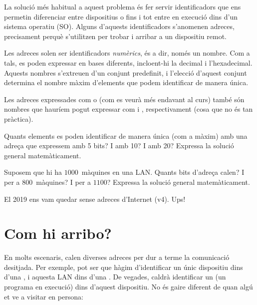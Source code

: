 La solució més habitual a aquest problema és fer servir identificadors que ens permetin
diferenciar entre dispositius o fins i tot entre  en execució
dins d'un sistema operatiu (SO). Alguns d'aquests identificadors
s'anomenen adreces, precisament perquè s'utilitzen 
per trobar i arribar a un dispositiu remot. 


Les adreces solen ser identificadors \textit{numèrics}, és a dir, només un nombre.
Com a tals, es poden expressar en bases diferents, incloent-hi la decimal i l'hexadecimal.
Aquests nombres s'extreuen d'un conjunt predefinit, i l'elecció d'aquest conjunt
determina el nombre màxim d'elements que podem identificar de manera única.

\begin{remark}
Les adreces expressades com  o  
(com es veurà més endavant al curs) també són nombres que hauríem pogut expressar 
com  i , respectivament
(cosa que no és tan pràctica).
\end{remark}

\begin{exercise}
Quants elements es poden identificar de manera única (com a màxim) amb una adreça que expressem 
amb 5 bits? I amb 10? I amb 20? Expressa la solució general matemàticament.
\end{exercise}

\begin{exercise}
Suposem que hi ha $1000$~màquines en una LAN. Quants bits d'adreça calen?
I per a $800$~màquines? I per a $1100$? Expressa la solució general matemàticament.
\end{exercise} 

\begin{remark}
El 2019 ens vam quedar sense adreces d'Internet (v4). Ups!
\end{remark}

\section{Com hi arribo?}\label{sec:where:route}

En molts escenaris, calen diverses adreces per dur a terme la comunicació 
 desitjada. Per exemple, pot ser que hàgim d'identificar
un únic dispositiu dins d'una , i aquesta LAN dins d'una . De vegades, caldrà 
identificar un  (un programa en execució) dins d'aquest dispositiu. 
No és gaire diferent de quan algú et ve a visitar en persona:

